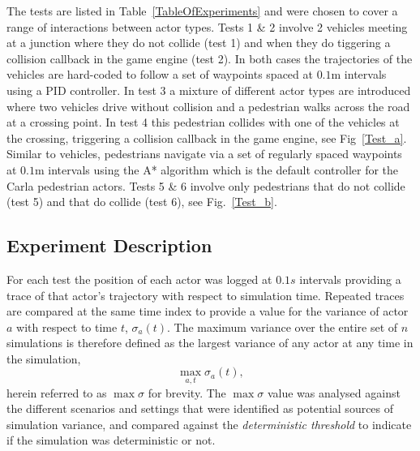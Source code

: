 \documentclass[letterpaper, 10 pt, journal, twoside]{IEEEtran}
\begin{document}
The tests are listed in Table~\ref{TableOfExperiments} and were chosen to cover a range of interactions between actor types. 
%
Tests 1 \& 2 involve 2 vehicles meeting at a junction where they do not collide (test 1) and when they do tiggering a collision callback in the game engine (test 2). In both cases the trajectories of the vehicles are hard-coded to follow a set of waypoints spaced at $0.1$m intervals using a PID controller. In test 3 a mixture of different actor types are introduced where two vehicles drive without collision and a pedestrian walks across the road at a crossing point. In test 4 this pedestrian collides with one of the vehicles at the crossing, triggering a collision callback in the game engine, see Fig~\ref{Test_a}. Similar to vehicles, pedestrians navigate via a set of regularly spaced waypoints at $0.1$m intervals using the A* algorithm which is the default controller for the Carla pedestrian actors. Tests 5 \& 6 involve only pedestrians that do not collide (test 5) and that do collide (test 6), see Fig.~\ref{Test_b}. 


\subsection{Experiment Description}\label{s:Experiment_Description}
For each test the position of each actor was logged at $0.1s$ intervals providing a trace of that actor's trajectory with respect to simulation time. Repeated traces are compared at the same time index to provide a value for the variance of actor $a$ with respect to time $t$, $\sigma_a(t)$. The maximum variance over the entire set of $n$ simulations is therefore defined as the largest variance of any actor at any time in the simulation, 
\begin{equation} \label{eq:max_sigma}
\max_{a,t}\sigma_a(t), 
\end{equation}
herein referred to as $\max\sigma$ for brevity.
The $\max\sigma$ value was analysed against the different scenarios and settings that were identified as potential sources of simulation variance, and compared against the \textit{deterministic threshold} to indicate if the simulation was deterministic or not. 
%
\end{document}
